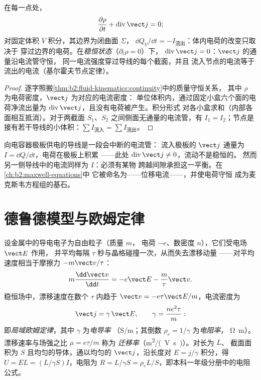 \begin{theorem}[电荷的局域守恒]\label{thm:b2:charges-currents-conduction:conservation}
在每一点处，
\[
\frac{\partial\rho}{\partial t} + \operatorname{div}\vect j = 0 ;
\]
对固定体积 $V$ 积分，其边界为闭曲面 $\Sigma$，
$\dd Q_V/\dd t = -I_{\text{流出}}$：体内电荷的改变只取决于
穿过边界的电荷。在\emph{稳恒状态}（$\partial_t\rho = 0$）下，
$\operatorname{div}\vect j = 0$：$\vect j$ 的通量沿电流管守恒，
同一电流强度穿过导线的每个截面，并且
流入节点的电流等于流出的电流（基尔霍夫节点定律）。
\end{theorem}

\begin{proof}
逐字照搬\cref{thm:b2:fluid-kinematics:continuity}中的质量守恒关系，
其中 $\rho$ 为电荷密度，$\vect j$ 为对应的电流密度：
单位体积内，通过固定小盒六个面的电荷净流出量为
$\operatorname{div}\vect j$，且没有电荷被产生。积分形式
对各小盒求和（内部各面相互抵消）。对于两截面
$S_1$、$S_2$ 之间侧面无通量的电流管，有 $I_1 = I_2$；节点是
接有若干导线的小体积：$\sum I_{\text{流入}} = \sum I_{\text{流出}}$。
\end{proof}

\begin{remark}\label{rem:b2:charges-currents-conduction:capacitor}
向电容器极板供电的导线是一段会中断的电流管：
流入极板的 $\vect j$ 通量为 $I = \dd Q/\dd t$，电荷在极板上积累
——此处 $\operatorname{div}\vect j \ne 0$，流动不是稳恒的。
然而另一侧导线中的电流同样为 $I$：必须有某物
跨越间隙承担这一平衡。在\cref{ch:b2:maxwell-equations}中
它被命名为——位移电流——，并使电荷守恒
成为麦克斯韦方程组的基石。
\end{remark}

\section{德鲁德模型与欧姆定律}

\begin{proposition}\label{prop:b2:charges-currents-conduction:drude}
设金属中的导电电子为自由粒子（质量 $m$，
电荷 $-e$、数密度 $n$），它们受电场 $\vect E$ 作用，
并平均每隔 $\tau$ 秒与晶格碰撞一次，从而失去漂移动量
——对平均速度相当于摩擦力 $-m\vect v/\tau$：
\[
m\frac{\dd\vect v}{\dd t} = -e\vect E - \frac m\tau\vect v .
\]
稳恒场中，漂移速度在数个 $\tau$ 内趋于 $\vect v = -e\tau
\vect E/m$，电流密度为
\[
\vect j = \gamma\,\vect E , \qquad \gamma = \frac{ne^2\tau}{m} :
\]
即\emph{局域欧姆定律}，其中 $\gamma$ 为\emph{电导率}
（\unit{S/m}；其倒数 $\rho_e = 1/\gamma$ 为\emph{电阻率}，
\unit{\ohm.m}）。漂移速率与场强之比 $\mu = e\tau/m$ 称为
\emph{迁移率}（\unit{m^2/(V.s)}）。对长为 $L$、
截面面积为 $S$ 且均匀的导体，通以均匀的 $\vect j$，沿长度对 $E = j/\gamma$
积分，得 $U = EL = (L/\gamma S)I$，电阻为 $R = L/\gamma S
= \rho_eL/S$，即本科一年级分册中的电阻公式。
\end{proposition}

